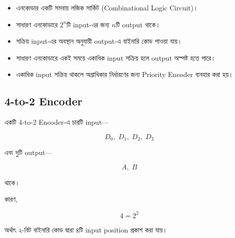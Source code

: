 \begin{itemize}[label={{\bulletfont\textbullet}}, leftmargin=*, nosep]

    \item এনকোডার একটি সমবায় লজিক সার্কিট
    (\textenglish{Combinational Logic Circuit})।

    \item সাধারণ এনকোডারে \(2^n\)টি
    \textenglish{input}-এর জন্য \(n\)টি
    \textenglish{output} থাকে।

    \item সক্রিয় \textenglish{input}-এর অবস্থান অনুযায়ী
    \textenglish{output}-এ বাইনারি কোড পাওয়া যায়।

    \item সাধারণ এনকোডারে একই সময়ে একাধিক
    \textenglish{input} সক্রিয় হলে
    \textenglish{output} অস্পষ্ট হতে পারে।

    \item একাধিক \textenglish{input} সক্রিয় থাকলে
    অগ্রাধিকার নির্ধারণের জন্য
    \textenglish{Priority Encoder} ব্যবহার করা হয়।

\end{itemize}



\subsection{\textenglish{4-to-2 Encoder}}

একটি \textenglish{4-to-2 Encoder}-এ চারটি
\textenglish{input}—

\[
D_0,\;D_1,\;D_2,\;D_3
\]

এবং দুটি \textenglish{output}—

\[
A,\;B
\]

থাকে।

কারণ,

\[
4=2^2
\]

অর্থাৎ ২-বিট বাইনারি কোড দ্বারা ৪টি
\textenglish{input position} প্রকাশ করা যায়।



